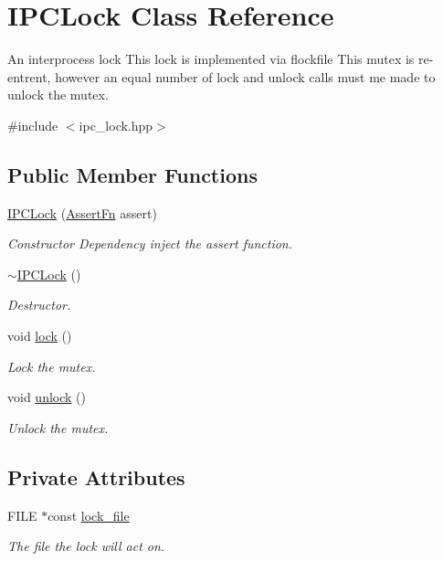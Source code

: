 \hypertarget{class_i_p_c_lock}{}\section{I\+P\+C\+Lock Class Reference}
\label{class_i_p_c_lock}


An interprocess lock This lock is implemented via flockfile This mutex is re-\/entrent, however an equal number of lock and unlock calls must me made to unlock the mutex.  




{\ttfamily \#include $<$ipc\+\_\+lock.\+hpp$>$}

\subsection*{Public Member Functions}
\begin{DoxyCompactItemize}
\item 
\hyperlink{class_i_p_c_lock_a5d01d85f49379d3bc534d81ead76bd91}{I\+P\+C\+Lock} (\hyperlink{ipc__lock_8hpp_af7f6b37b504b188bb4eb248b13a6bdc1}{Assert\+Fn} assert)
\begin{DoxyCompactList}\small\item\em Constructor Dependency inject the assert function. \end{DoxyCompactList}\item 
\hyperlink{class_i_p_c_lock_ab0cb32d1b958cd4c9754666888caf358}{$\sim$\+I\+P\+C\+Lock} ()
\begin{DoxyCompactList}\small\item\em Destructor. \end{DoxyCompactList}\item 
void \hyperlink{class_i_p_c_lock_a9f6575d48f5754b13d9a1a59451ff2a3}{lock} ()
\begin{DoxyCompactList}\small\item\em Lock the mutex. \end{DoxyCompactList}\item 
void \hyperlink{class_i_p_c_lock_a28399a1d6ba139319c4addcaccb93a79}{unlock} ()
\begin{DoxyCompactList}\small\item\em Unlock the mutex. \end{DoxyCompactList}\end{DoxyCompactItemize}
\subsection*{Private Attributes}
\begin{DoxyCompactItemize}
\item 
F\+I\+LE $\ast$const \hyperlink{class_i_p_c_lock_a6b34119dda186eba6688250cd60cc347}{lock\+\_\+file}
\begin{DoxyCompactList}\small\item\em The file the lock will act on. \end{DoxyCompactList}\end{DoxyCompactItemize}


